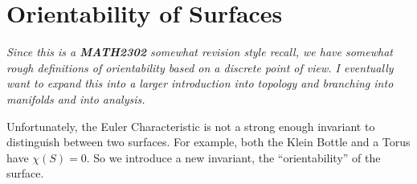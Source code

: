 \documentclass[11pt]{article}
\begin{document}
\section{Orientability of Surfaces}
\label{sec:orgb9091a1}
\emph{Since this is a \textbf{MATH2302} somewhat revision style recall, we have somewhat rough definitions of orientability based on a discrete point of view. I eventually want to expand this into a larger introduction into topology and branching into manifolds and into analysis.}

Unfortunately, the Euler Characteristic is not a strong enough invariant to distinguish between two surfaces. For example, both the Klein Bottle and a Torus have \(\chi(S) = 0\). So we introduce a new invariant, the ``orientability'' of the surface.
\end{document}
